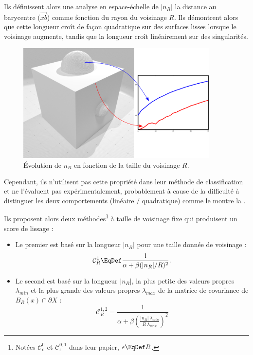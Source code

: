 Ils définissent alors une analyse en espace-échelle de $|n_R|$ la distance au barycentre ($\vec{xb}$) comme fonction du rayon du voisinage $R$. Ils démontrent
alors que cette longueur croît de façon quadratique sur des surfaces lisses
lorsque le voisinage augmente, tandis que la longueur croît linéairement sur des
singularités.

\begin{figure}[ht]{
    \begin{center}
    \includegraphics[height=6cm]{figures/CubeSpherePlotMoment_SS}
    \end{center}}
    \caption[Évolution de $n_R$ en fonction de la taille du voisinage $R$]{Évolution de $n_R$ en fonction de la taille du voisinage $R$.
      \label{fig:moment-multiscale}}
\end{figure}

Cependant, ils n'utilisent pas cette propriété dans leur méthode de
classification et ne l'évaluent pas expérimentalement, probablement à cause de la difficulté à distinguer les deux comportements (linéaire / quadratique) comme le montre la .

Ils proposent alors deux méthodes\footnote{Notées $\mathcal{C}_{\epsilon}^{0}$
et $\mathcal{C}_{\epsilon}^{0,1}$ dans leur papier, $\epsilon \EqDef R$.} à taille de
voisinage fixe qui produisent un score de lissage :

\begin{itemize}

  \item Le premier est basé sur la longueur $|n_R|$ pour une taille donnée de
  voisinage :
  \begin{equation}
    \mathcal{C}_{R}^{1} \EqDef \frac{1}{\alpha + \beta(|n_R|/R)^2} \text{.}
    \label{eq:moment-C0}
  \end{equation}

  \item Le second est basé sur la longueur $|n_R|$, la plus petite des valeurs
  propres $\lambda_{min}$ et la plus grande des valeurs propres $\lambda_{max}$
  de la matrice de covariance de $B_R(x)\cap \partial X$ :
  \begin{equation}
    \mathcal{C}_{R}^{1,2} = \frac{1}{\alpha + \beta
    \left( \frac{|n_R|~\lambda_{min}}{R~\lambda_{max}} \right)^2}
    \label{eq:moment-C1}
  \end{equation}

\end{itemize}

